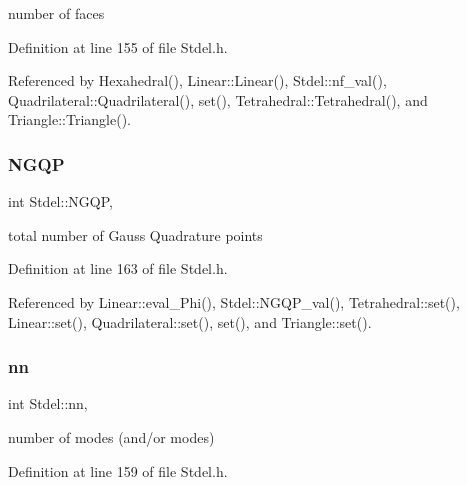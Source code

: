 number of faces 



Definition at line 155 of file Stdel.\+h.



Referenced by Hexahedral(), Linear\+::\+Linear(), Stdel\+::nf\+\_\+val(), Quadrilateral\+::\+Quadrilateral(), set(), Tetrahedral\+::\+Tetrahedral(), and Triangle\+::\+Triangle().

\mbox{\label{classStdel_aa3cff31280606cd3eb95af770dd6f5b4}} 
\subsubsection{\texorpdfstring{N\+G\+QP}{NGQP}}
{\footnotesize\ttfamily int Stdel\+::\+N\+G\+QP\hspace{0.3cm}{\ttfamily [protected]}, {\ttfamily [inherited]}}



total number of Gauss Quadrature points 



Definition at line 163 of file Stdel.\+h.



Referenced by Linear\+::eval\+\_\+\+Phi(), Stdel\+::\+N\+G\+Q\+P\+\_\+val(), Tetrahedral\+::set(), Linear\+::set(), Quadrilateral\+::set(), set(), and Triangle\+::set().

\mbox{\label{classStdel_af4d02765d362e2f0469633ff78734f89}} 
\subsubsection{\texorpdfstring{nn}{nn}}
{\footnotesize\ttfamily int Stdel\+::nn\hspace{0.3cm}{\ttfamily [protected]}, {\ttfamily [inherited]}}



number of modes (and/or modes) 



Definition at line 159 of file Stdel.\+h.



